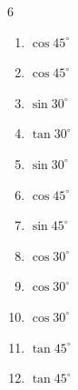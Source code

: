\begin{multicols}{6}
\begin{enumerate}

  \item $\displaystyle \cos{45^\circ}$


  \item $\displaystyle \cos{45^\circ}$


  \item $\displaystyle \sin{30^\circ}$


  \item $\displaystyle \tan{30^\circ}$


  \item $\displaystyle \sin{30^\circ}$


  \item $\displaystyle \cos{45^\circ}$


  \item $\displaystyle \sin{45^\circ}$


  \item $\displaystyle \cos{30^\circ}$


  \item $\displaystyle \cos{30^\circ}$


  \item $\displaystyle \cos{30^\circ}$


  \item $\displaystyle \tan{45^\circ}$

        \phantom{$\displaystyle =1$}

\columnbreak %

  \item $\displaystyle \tan{45^\circ}$


\end{enumerate}
\end{multicols}

